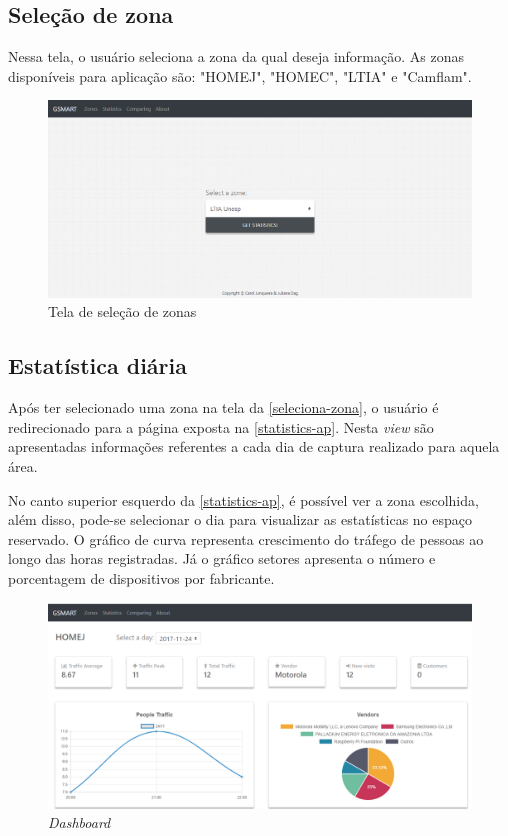 \subsection{Seleção de zona}
\label{seleciona-zona}
Nessa tela, o usuário seleciona a zona da qual deseja informação. As zonas disponíveis para aplicação são:
"HOMEJ", "HOMEC", "LTIA" e "Camflam".

\begin{figure}[!h]
  \caption{\label{zones-ap}Tela de seleção de zonas}
  \begin{center}
    \includegraphics[width=1.0\textwidth]{img/zones.png}
  \end{center}
\end{figure}

\subsection{Estatística diária}
\label{diaria}
Após ter selecionado uma zona na tela da \autoref{seleciona-zona}, o usuário é
redirecionado para a página exposta na \autoref{statistics-ap}. Nesta
\emph{view} são apresentadas informações referentes a cada dia de captura
realizado para aquela área.

No canto superior esquerdo da \autoref{statistics-ap}, é possível ver a zona
escolhida, além disso, pode-se selecionar o dia para visualizar as estatísticas
no espaço reservado. O gráfico de curva representa crescimento do tráfego de pessoas ao longo das
horas registradas. Já o gráfico setores apresenta o número e porcentagem de dispositivos por fabricante.

\begin{figure}[!h]
  \caption{\label{statistics-ap}\emph{Dashboard}}
  \begin{center}
    \includegraphics[width=1.0\textwidth]{img/statistics.png}
  \end{center}
\end{figure}

